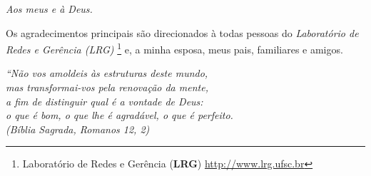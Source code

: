 \documentclass[12pt,openright,twoside,a4paper,english,brazil]{abntex2}
\begin{document}

\begin{dedicatoria}
   \vspace*{\fill}
   \centering
   \noindent
   \textit{ Aos meus e à Deus.} \vspace*{\fill}
\end{dedicatoria}


\begin{agradecimentos}

Os agradecimentos principais são direcionados à todas pessoas do
\emph{Laboratório de Redes e Gerência (LRG)} \footnote{Laboratório de Redes e
Gerência (\textbf{LRG}) \url{http://www.lrg.ufsc.br}} e, a minha esposa, meus
pais, familiares e amigos.
\end{agradecimentos}


\begin{epigrafe}
    \vspace*{\fill}
	\begin{flushright}
		\textit{``Não vos amoldeis às estruturas deste mundo, \\
		mas transformai-vos pela renovação da mente, \\
		a fim de distinguir qual é a vontade de Deus: \\
		o que é bom, o que lhe é agradável, o que é perfeito.\\
		(Bíblia Sagrada, Romanos 12, 2)}
	\end{flushright}
\end{epigrafe}


\tableofcontents*
\cleardoublepage


\listoffigures*
\cleardoublepage


\listoftables*
\cleardoublepage

\end{document}
